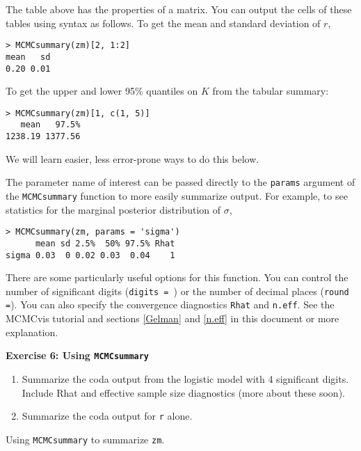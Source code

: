 \documentclass[12pt,english]{article}
\begin{document}
\noindent The table above has the properties of a matrix. You can output the cells of these tables using syntax as follows. To get the mean and standard deviation of $r$,

\begin{Verbatim}
> MCMCsummary(zm)[2, 1:2]
mean   sd 
0.20 0.01 
\end{Verbatim}

\noindent To get the upper and lower 95\% quantiles on $K$ from the tabular summary: 

\begin{Verbatim}
> MCMCsummary(zm)[1, c(1, 5)]
   mean   97.5% 
1238.19 1377.56
\end{Verbatim}
We will learn easier, less error-prone ways to do this below.

\noindent  The parameter name of interest can be passed directly to the \texttt{params} argument of the \texttt{MCMCsummary} function to more easily summarize output. For example, to see statistics for the marginal posterior distribution of $\sigma$,

\begin{Verbatim}
> MCMCsummary(zm, params = 'sigma')
      mean sd 2.5%  50% 97.5% Rhat
sigma 0.03  0 0.02 0.03  0.04    1
\end{Verbatim}

There are some particularly useful options for this function.  You can control the number of significant digits (\texttt{digits = }) or the number of decimal places (\texttt{round =}).  You can also specify the convergence diagnostics \texttt{Rhat} and \texttt{n.eff}.  See the MCMCvis tutorial and sections \ref{Gelman} and \ref{n.eff}  in this document or more explanation.

\bigskip
\belowcaptionskip=-20pt
\begin{exercise}
\begin{mdframed}
\doublespacing
\textbf{Exercise 6: Using \texttt{MCMCsummary}} 
\begin{enumerate}
\item Summarize the coda output from the logistic model with 4 significant digits.  Include Rhat and effective sample size diagnostics (more about these soon). 
\item Summarize the coda output for  \texttt{r} alone.  
\end{enumerate}
\end{mdframed}
\captionsetup{textformat=empty, labelformat=empty}
\caption[Using \texttt{MCMCsummary} to summarize \texttt{zm}]{Using \texttt{MCMCsummary} to summarize \texttt{zm}.}
\label{ex:MCMCsummary}
\end{exercise}
\belowcaptionskip=0pt
\end{document}
